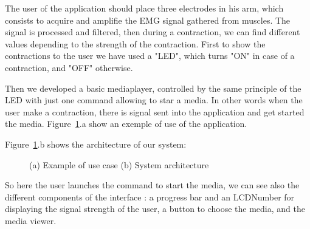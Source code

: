 \documentclass[conference]{IEEEtran}
\begin{document}
The user of the application should place three electrodes in his arm, which consists to acquire and amplifie the EMG signal gathered from muscles.
The signal is processed and filtered, then during a contraction, we can find different values depending to the strength of the contraction.
First to show the contractions to the user we have used a "LED", which turns "ON" in case of a contraction, and "OFF" otherwise.\par
Then we developed a basic mediaplayer, controlled by the same principle of the LED with just one command allowing to star a media. In other words
when the user make a contraction, there is signal sent into the application and get started the media.
Figure~\ref{fig:deux_figures}.a show an exemple of use of the application. \par
\par
Figure~\ref{fig:deux_figures}.b shows the architecture of our system:


\begin{figure}[t]
\caption{ (a) Example of use case (b) System architecture}
\label{fig:deux_figures}
\end{figure}

So here the user launches the command to start the media,
we can see also the different components of the interface : a progress bar and an LCDNumber for displaying the signal strength of the user,
a button to choose the media, and the media viewer.\par
\end{document}

